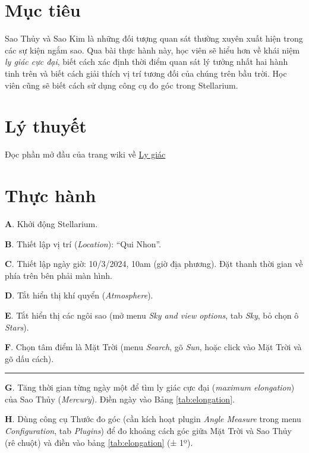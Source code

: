 \documentclass[
  a4paper,
]{book}
\begin{document}
\section{Mục tiêu}\label{mux1ee5c-tiuxeau-1}

Sao Thủy và Sao Kim là những đối tượng quan sát thường xuyên xuất hiện trong các sự kiện ngắm sao. Qua bài thực hành này, học viên sẽ hiểu hơn về khái niệm \emph{ly giác cực đại}, biết cách xác định thời điểm quan sát lý tưởng nhất hai hành tinh trên và biết cách giải thích vị trí tương đối của chúng trên bầu trời. Học viên cũng sẽ biết cách sử dụng công cụ đo góc trong Stellarium.

\section{Lý thuyết}\label{luxfd-thuyux1ebft-1}

Đọc phần mở đầu của trang wiki về \href{https://vi.wikipedia.org/wiki/Ly_gi\%C3\%A1c_(thi\%C3\%AAn_v\%C4\%83n_h\%E1\%BB\%8Dc)}{Ly giác}

\section{Thực hành}\label{thux1ef1c-huxe0nh-1}

\textbf{A}. Khởi động Stellarium.

\textbf{B}. Thiết lập vị trí (\emph{Location}): ``Qui Nhon''.

\textbf{C}. Thiết lập ngày giờ: 10/3/2024, 10am (giờ địa phương). Đặt thanh thời gian về phía trên bên phải màn hình.

\textbf{D}. Tắt hiển thị khí quyển (\emph{Atmosphere}).

\textbf{E}. Tắt hiển thị các ngôi sao (mở menu \emph{Sky and view options}, tab \emph{Sky}, bỏ chọn ô \emph{Stars}).

\textbf{F}. Chọn tâm điểm là Mặt Trời (menu \emph{Search}, gõ \emph{Sun}, hoặc click vào Mặt Trời và gõ dấu cách).

\begin{center}\rule{0.5\linewidth}{0.5pt}\end{center}

\textbf{G}. Tăng thời gian từng ngày một để tìm ly giác cực đại (\emph{maximum elongation}) của Sao Thủy (\emph{Mercury}). Điền ngày vào Bảng \ref{tab:elongation}.

\textbf{H}. Dùng công cụ Thước đo góc (cần kích hoạt plugin \emph{Angle Measure} trong menu \emph{Configuration}, tab \emph{Plugins}) để đo khoảng cách góc giữa Mặt Trời và Sao Thủy (rê chuột) và điền vào bảng \ref{tab:elongation} (± 1º).
\end{document}

